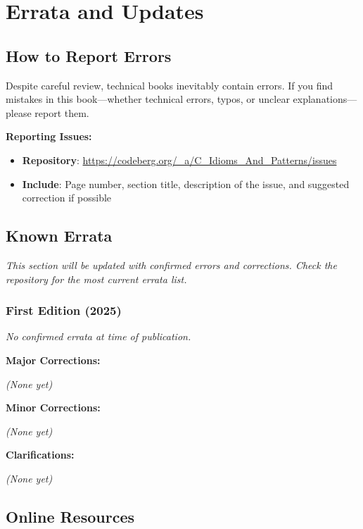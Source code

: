 \documentclass[10pt,openany]{book}
\begin{document}
\chapter{Errata and Updates}

\section*{How to Report Errors}

Despite careful review, technical books inevitably contain errors. If you find mistakes in this book—whether technical errors, typos, or unclear explanations—please report them.

\textbf{Reporting Issues:}

\begin{itemize}
    \item \textbf{Repository}: \url{https://codeberg.org/_a/C_Idioms_And_Patterns/issues}
    \item \textbf{Include}: Page number, section title, description of the issue, and suggested correction if possible
\end{itemize}

\section*{Known Errata}

\textit{This section will be updated with confirmed errors and corrections. Check the repository for the most current errata list.}

\subsection*{First Edition (2025)}

\textit{No confirmed errata at time of publication.}

\vspace{1em}

\textbf{Major Corrections:}

\textit{(None yet)}

\vspace{1em}

\textbf{Minor Corrections:}

\textit{(None yet)}

\vspace{1em}

\textbf{Clarifications:}

\textit{(None yet)}

\section*{Online Resources}
\end{document}
